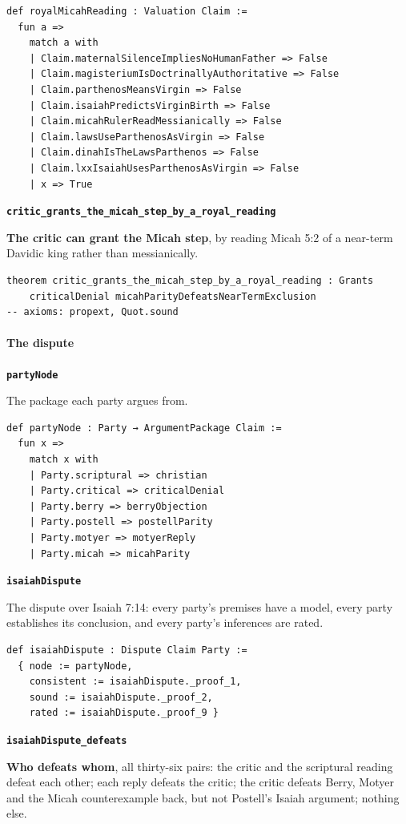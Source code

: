 \documentclass[11pt]{article}
\begin{document}
{\small\begin{verbatim}
def royalMicahReading : Valuation Claim :=
  fun a =>
    match a with
    | Claim.maternalSilenceImpliesNoHumanFather => False
    | Claim.magisteriumIsDoctrinallyAuthoritative => False
    | Claim.parthenosMeansVirgin => False
    | Claim.isaiahPredictsVirginBirth => False
    | Claim.micahRulerReadMessianically => False
    | Claim.lawsUseParthenosAsVirgin => False
    | Claim.dinahIsTheLawsParthenos => False
    | Claim.lxxIsaiahUsesParthenosAsVirgin => False
    | x => True
\end{verbatim}}
\par\medskip\noindent\textbf{\texttt{critic\_\allowbreak{}grants\_\allowbreak{}the\_\allowbreak{}micah\_\allowbreak{}step\_\allowbreak{}by\_\allowbreak{}a\_\allowbreak{}royal\_\allowbreak{}reading}}\par\nobreak\noindent
\textbf{The critic can grant the Micah step}, by reading Micah 5:2 of a near-term Davidic king rather than messianically.

{\small\begin{verbatim}
theorem critic_grants_the_micah_step_by_a_royal_reading : Grants
    criticalDenial micahParityDefeatsNearTermExclusion
-- axioms: propext, Quot.sound
\end{verbatim}}
\paragraph*{The dispute}
\leavevmode\par\nobreak
\par\medskip\noindent\textbf{\texttt{party\allowbreak{}Node}}\par\nobreak\noindent
The package each party argues from.

{\small\begin{verbatim}
def partyNode : Party → ArgumentPackage Claim :=
  fun x =>
    match x with
    | Party.scriptural => christian
    | Party.critical => criticalDenial
    | Party.berry => berryObjection
    | Party.postell => postellParity
    | Party.motyer => motyerReply
    | Party.micah => micahParity
\end{verbatim}}
\par\medskip\noindent\textbf{\texttt{isaiah\allowbreak{}Dispute}}\par\nobreak\noindent
The dispute over Isaiah 7:14: every party’s premises have a model, every party establishes its conclusion, and every party’s inferences are rated.

{\small\begin{verbatim}
def isaiahDispute : Dispute Claim Party :=
  { node := partyNode,
    consistent := isaiahDispute._proof_1,
    sound := isaiahDispute._proof_2,
    rated := isaiahDispute._proof_9 }
\end{verbatim}}
\par\medskip\noindent\textbf{\texttt{isaiah\allowbreak{}Dispute\_\allowbreak{}defeats}}\par\nobreak\noindent
\textbf{Who defeats whom}, all thirty-six pairs: the critic and the scriptural reading defeat each other; each reply defeats the critic; the critic defeats Berry, Motyer and the Micah counterexample back, but not Postell’s Isaiah argument; nothing else.
\end{document}
